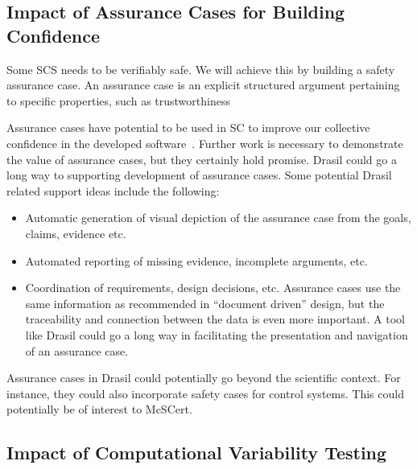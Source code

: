 \documentclass[12pt]{article}
\begin{document}
\subsection{Impact of Assurance Cases for Building Confidence}

Some SCS needs to be verifiably safe.  We will achieve this by building a safety
assurance case. An assurance case is an explicit structured argument pertaining
to specific properties, such as trustworthiness

Assurance cases have potential to be used in SC to improve our collective
confidence in the developed software~\cite{SmithEtAl2018_ICSEPoster}.  Further
work is necessary to demonstrate the value of assurance cases, but they
certainly hold promise.  Drasil could go a long way to supporting development of
assurance cases.  Some potential Drasil related support ideas include the
following:

\begin{itemize}
\item Automatic generation of visual depiction of the assurance case from the
  goals, claims, evidence etc.
\item Automated reporting of missing evidence, incomplete arguments, etc.
\item Coordination of requirements, design decisions, etc.  Assurance cases use
  the same information as recommended in ``document driven'' design, but the
  traceability and connection between the data is even more important.  A tool
  like Drasil could go a long way in facilitating the presentation and
  navigation of an assurance case.
\end{itemize}

Assurance cases in Drasil could potentially go beyond the scientific context.
For instance, they could also incorporate safety cases for
control systems.  This could potentially be of interest to McSCert.

\subsection{Impact of Computational Variability Testing}
\end{document}
